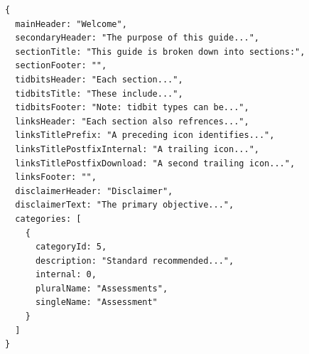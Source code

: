\documentclass[onecolumn, draftclsnofoot,10pt, compsoc, usenames, dvipsnames]{IEEEtran}
\begin{document}
\begin{lstlisting}[caption=Example Response]
{ 
  mainHeader: "Welcome",
  secondaryHeader: "The purpose of this guide...",
  sectionTitle: "This guide is broken down into sections:",
  sectionFooter: "",
  tidbitsHeader: "Each section...",
  tidbitsTitle: "These include...",
  tidbitsFooter: "Note: tidbit types can be...",
  linksHeader: "Each section also refrences...",
  linksTitlePrefix: "A preceding icon identifies...",
  linksTitlePostfixInternal: "A trailing icon...",
  linksTitlePostfixDownload: "A second trailing icon...",
  linksFooter: "",
  disclaimerHeader: "Disclaimer",
  disclaimerText: "The primary objective...",
  categories: [
    {
      categoryId: 5,
      description: "Standard recommended...",
      internal: 0,
      pluralName: "Assessments",
      singleName: "Assessment"
    }
  ]
}
\end{lstlisting}
\\~\\
\end{document}
